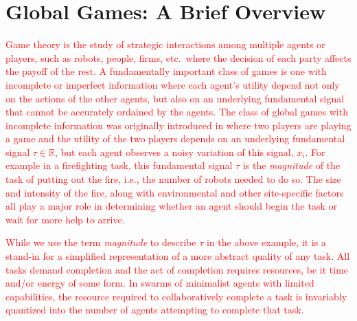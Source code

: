 \documentclass[smallextended]{svjour3}       %
\newcommand{\edit}[1]{\textcolor{red}{#1}}
\begin{document}
\section{Global Games: A Brief Overview}\label{sec:ggoverview}
\edit{Game theory is the study of strategic interactions among multiple agents or players, such as robots, people, firms, etc.\ where the decision of each party affects the payoff of the rest. A fundamentally important class of games is one with incomplete or imperfect information where each agent's utility depend not only on the actions of the other agents, but also on an underlying fundamental signal that cannot be accurately ordained by the agents. The class of global games with incomplete information was originally introduced in \cite{Carlsson1993} where two players are playing a game and the utility of the two players depends on an underlying fundamental signal $\tau \in \mathbb{R}$, but each agent observes a noisy variation of this signal, $x_i$. For example in a firefighting task, this fundamental signal $\tau$ is the \emph{magnitude} of the task of putting out the fire, i.e., the number of robots needed to do so. The size and intensity of the fire, along with environmental and other site-specific factors all play a major role in determining whether an agent should begin the task or wait for more help to arrive.}

\edit{While we use the term \emph{magnitude} to describe $\tau$ in the above example, it is a stand-in for a simplified representation of a more abstract quality of any task. All tasks demand completion and the act of completion requires resources, be it time and/or energy of some form. In swarms of minimalist agents with limited capabilities, the resource required to collaboratively complete a task is invariably quantized into the number of agents attempting to complete that task.}
\end{document}
